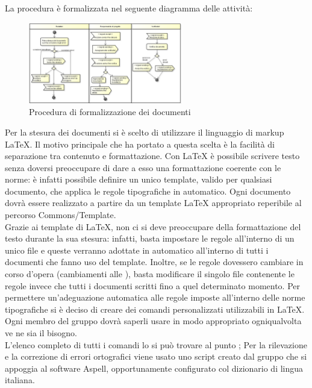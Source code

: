 			La procedura è formalizzata nel seguente diagramma delle attività:
			\begin{figure}[H]
				\centering
				\includegraphics[width=0.6\textwidth]{NormeDiProgetto/Pics/FormalizzazioneDocumenti}
				\caption{Procedura di formalizzazione dei documenti}
			\end{figure}
			Per la stesura dei documenti si è scelto di utilizzare il linguaggio di markup \LaTeX{}.  Il motivo principale che ha portato a questa scelta è la facilità di separazione tra contenuto e formattazione. Con \LaTeX{} è possibile scrivere testo senza doversi preoccupare di dare a esso una formattazione coerente con le norme: è infatti possibile definire un unico template, valido per qualsiasi documento, che applica le regole tipografiche in automatico.
				Ogni documento dovrà essere realizzato a partire da un template \LaTeX{} appropriato reperibile al percorso Commons/Template.\\
				Grazie ai template di \LaTeX{}, non ci si deve preoccupare della formattazione del testo durante la sua stesura: infatti, basta impostare le regole all’interno di un unico file e queste verranno adottate in automatico all’interno di tutti i documenti che fanno uso del template. Inoltre, se le regole dovessero cambiare in corso d’opera (cambiamenti alle ), basta modificare il singolo file contenente le regole invece che tutti i documenti scritti fino a quel determinato momento.
				Per permettere un’adeguazione automatica alle regole imposte all’interno delle norme tipografiche si è deciso di creare dei comandi personalizzati utilizzabili in \LaTeX{}. Ogni membro del gruppo dovrà saperli usare in modo appropriato ogniqualvolta ve ne sia il bisogno.\\
				L’elenco completo di tutti i comandi lo si può trovare al punto ;
			Per la rilevazione e la correzione di errori ortografici viene usato uno script creato dal gruppo \groupname{} che si appoggia al software Aspell, opportunamente configurato col dizionario di lingua italiana.
